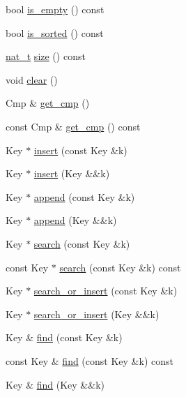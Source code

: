 \begin{DoxyCompactItemize}
bool \hyperlink{class_designar_1_1_tree_set_affe4342cb2019ced672a0dbf03a781b1}{is\+\_\+empty} () const
\item 
bool \hyperlink{class_designar_1_1_tree_set_a6321737660e743877ece201a0af184d0}{is\+\_\+sorted} () const
\item 
\hyperlink{namespace_designar_aa72662848b9f4815e7bf31a7cf3e33d1}{nat\+\_\+t} \hyperlink{class_designar_1_1_tree_set_acb3cd6e2382851772714603d5fe5c644}{size} () const
\item 
void \hyperlink{class_designar_1_1_tree_set_af3b2a6ab8c7f7fd7c319a392c33fd9d6}{clear} ()
\item 
Cmp \& \hyperlink{class_designar_1_1_tree_set_aec12ad907a431f411eb06b0643ba9d53}{get\+\_\+cmp} ()
\item 
const Cmp \& \hyperlink{class_designar_1_1_tree_set_ae1a8289ce177e865d9987f896038a289}{get\+\_\+cmp} () const
\item 
Key $\ast$ \hyperlink{class_designar_1_1_tree_set_a4533e89f7cea7d9a6494d443863a3223}{insert} (const Key \&k)
\item 
Key $\ast$ \hyperlink{class_designar_1_1_tree_set_ae057018e4d2dd133eb7464f5fbe051de}{insert} (Key \&\&k)
\item 
Key $\ast$ \hyperlink{class_designar_1_1_tree_set_a81abff4df0c9baf2fbf5c96a2d72cb67}{append} (const Key \&k)
\item 
Key $\ast$ \hyperlink{class_designar_1_1_tree_set_a25bb5eea05f2ab11a2c988686fc3a42c}{append} (Key \&\&k)
\item 
Key $\ast$ \hyperlink{class_designar_1_1_tree_set_a1f94f8b93dc1e0f9769ce2e7cfb4762f}{search} (const Key \&k)
\item 
const Key $\ast$ \hyperlink{class_designar_1_1_tree_set_a6b8bce7908110a0ade8ca556191d29be}{search} (const Key \&k) const
\item 
Key $\ast$ \hyperlink{class_designar_1_1_tree_set_a0864bfc148a71b4ea0877d07d4924cd0}{search\+\_\+or\+\_\+insert} (const Key \&k)
\item 
Key $\ast$ \hyperlink{class_designar_1_1_tree_set_a481f16723d8f1e3c2d351d93910a34cd}{search\+\_\+or\+\_\+insert} (Key \&\&k)
\item 
Key \& \hyperlink{class_designar_1_1_tree_set_ad35f91ea97d8497e938876a2064024e8}{find} (const Key \&k)
\item 
const Key \& \hyperlink{class_designar_1_1_tree_set_a8c2e4641f594f7e541ae2d5d9c483299}{find} (const Key \&k) const
\item 
Key \& \hyperlink{class_designar_1_1_tree_set_a40ba1bcb8ca94157e3890b3e81be4794}{find} (Key \&\&k)

\end{DoxyCompactItemize}
